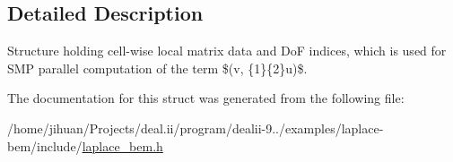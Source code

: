 \subsection{Detailed Description}
Structure holding cell-\/wise local matrix data and DoF indices, which is used for S\+MP parallel computation of the term \$(v, \{1\}\{2\}u)\$. 

The documentation for this struct was generated from the following file\+:\begin{DoxyCompactItemize}
\item 
/home/jihuan/\+Projects/deal.\+ii/program/dealii-\/9../examples/laplace-\/bem/include/\hyperlink{laplace__bem_8h}{laplace\+\_\+bem.\+h}\end{DoxyCompactItemize}
